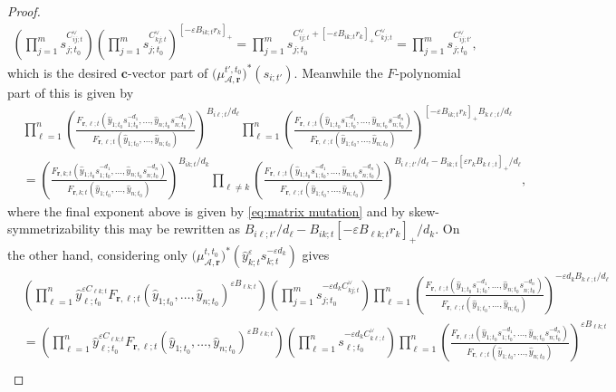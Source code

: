 \documentclass{amsart}
\numberwithin{equation}{section}
\newcommand{\bfc}{\mathbf{c}}
\newcommand{\bfr}{{\boldsymbol{r}}}
\newcommand{\cA}{\mathcal{A}}
\begin{document}
\begin{proof}
  \begin{align*}
    \left(\prod_{j=1}^m s_{j;t_0}^{C^\vee_{ij;t}}\right)\left(\prod_{j=1}^m s_{j;t_0}^{C^\vee_{kj;t}}\right)^{[-\varepsilon B_{ik;t} r_k]_+}
    =\prod_{j=1}^m s_{j;t_0}^{C^\vee_{ij;t} + [-\varepsilon B_{ik;t} r_k]_+ C^\vee_{kj;t}}
    =\prod_{j=1}^m s_{j;t_0}^{C^\vee_{ij;t'}},
  \end{align*}
  which is the desired $\bfc$-vector part of $\big(\mu_{\cA,\bfr}^{t',t_0}\big)^*(s_{i;t'})$.
  Meanwhile the $F$-polynomial part of this is given by
  \begin{align*}
    &\prod_{\ell=1}^n \left(\frac{F_{\bfr,\ell;t}(\hat y_{1;t_0} s_{1;t_0}^{-d_1},\ldots,\hat y_{n;t_0} s_{n;t_0}^{-d_n})}{F_{\bfr,\ell;t}(\hat y_{1;t_0},\ldots,\hat y_{n;t_0})}\right)^{B_{i\ell;t}/d_\ell}
    \prod_{\ell=1}^n \left(\frac{F_{\bfr,\ell;t}(\hat y_{1;t_0} s_{1;t_0}^{-d_1},\ldots,\hat y_{n;t_0} s_{n;t_0}^{-d_n})}{F_{\bfr,\ell;t}(\hat y_{1;t_0},\ldots,\hat y_{n;t_0})}\right)^{[-\varepsilon B_{ik;t} r_k]_+ B_{k\ell;t}/d_\ell}\\
    & = \left(\frac{F_{\bfr,k;t}(\hat y_{1;t_0} s_{1;t_0}^{-d_1},\ldots,\hat y_{n;t_0} s_{n;t_0}^{-d_n})}{F_{\bfr,k;t}(\hat y_{1;t_0},\ldots,\hat y_{n;t_0})}\right)^{B_{ik;t}/d_k}
    \prod_{\ell\ne k} \left(\frac{F_{\bfr,\ell;t}(\hat y_{1;t_0} s_{1;t_0}^{-d_1},\ldots,\hat y_{n;t_0} s_{n;t_0}^{-d_n})}{F_{\bfr,\ell;t}(\hat y_{1;t_0},\ldots,\hat y_{n;t_0})}\right)^{B_{i\ell;t'}/d_\ell-B_{ik;t} [\varepsilon r_k B_{k\ell;t}]_+/d_\ell},
  \end{align*}
  where the final exponent above is given by \eqref{eq:matrix mutation} and by skew-symmetrizability this may be rewritten as $B_{i\ell;t'}/d_\ell-B_{ik;t} [-\varepsilon B_{\ell k;t} r_k]_+/d_k$.
  On the other hand, considering only $\big(\mu_{\cA,\bfr}^{t,t_0}\big)^*\left(\hat y_{k;t}^\varepsilon s_{k;t}^{-\varepsilon d_k}\right)$ gives
  \begin{align*}
    \nonumber &\left(\prod_{\ell=1}^n \hat y_{\ell;t_0}^{\varepsilon C_{\ell k;t}} F_{\bfr,\ell;t}(\hat y_{1;t_0},\ldots,\hat y_{n;t_0})^{\varepsilon B_{\ell k;t}}\right) \left(\prod_{j=1}^m s_{j;t_0}^{-\varepsilon d_k C^\vee_{kj;t}}\right) \prod_{\ell=1}^n \left(\frac{F_{\bfr,\ell;t}(\hat y_{1;t_0} s_{1;t_0}^{-d_1},\ldots,\hat y_{n;t_0} s_{n;t_0}^{-d_n})}{F_{\bfr,\ell;t}(\hat y_{1;t_0},\ldots,\hat y_{n;t_0})}\right)^{-\varepsilon d_k B_{k\ell;t}/d_\ell}\\
    \nonumber &=\left(\prod_{\ell=1}^n \hat y_{\ell;t_0}^{\varepsilon C_{\ell k;t}} F_{\bfr,\ell;t}(\hat y_{1;t_0},\ldots,\hat y_{n;t_0})^{\varepsilon B_{\ell k;t}}\right) \left(\prod_{\ell=1}^n s_{\ell;t_0}^{-\varepsilon d_k C^\vee_{k\ell;t}}\right) \prod_{\ell=1}^n \left(\frac{F_{\bfr,\ell;t}(\hat y_{1;t_0} s_{1;t_0}^{-d_1},\ldots,\hat y_{n;t_0} s_{n;t_0}^{-d_n})}{F_{\bfr,\ell;t}(\hat y_{1;t_0},\ldots,\hat y_{n;t_0})}\right)^{\varepsilon B_{\ell k;t}}\\

\end{align*}
\end{proof}
\end{document}
